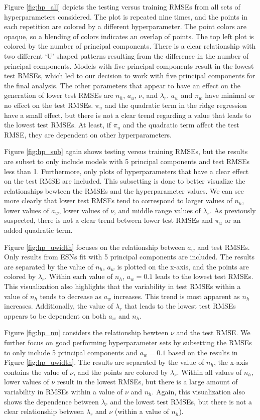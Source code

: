 \documentclass[AMS,STIX2COL]{WileyNJD-v2}
\begin{document}
Figure \ref{fig:hp_all} depicts the testing versus training RMSEs from all sets of hyperparameters considered.  The plot is repeated nine times, and the points in each repetition are colored by a different hyperparameter. The point colors are opaque, so a blending of colors indicates an overlap of points. The top left plot is colored by the number of principal components. There is a clear relationship with two different `U' shaped patterns resulting from the difference in the number of principal components. Models with five principal components result in the lowest test RMSEs, which led to our decision to work with five principal components for the final analysis. The other parameters that appear to have an effect on the generation of lower test RMSEs are $n_h$, $a_u$, $\nu$, and $\lambda_r$. $a_w$ and $\pi_w$ have minimal or no effect on the test RMSEs. $\pi_u$ and the quadratic term in the ridge regression have a small effect, but there is not a clear trend regarding a value that leads to the lowest test RMSEs. At least, if $\pi_u$ and the quadratic term affect the test RMSE, they are dependent on other hyperparameters.

Figure \ref{fig:hp_sub} again shows testing versus training RMSEs, but the results are subset to only include models with 5 principal components and test RMSEs less than 1. Furthermore, only plots of hyperparameters that have a clear effect on the test RMSE are included. This subsetting is done to better visualize the relationships bewteen the RMSEs and the hyperparameter values. We can see more clearly that lower test RMSEs tend to correspond to larger values of $n_h$, lower values of $a_w$, lower values of $\nu$, and middle range values of $\lambda_r$. As previously suspected, there is not a clear trend between lower test RMSEs and $\pi_u$ or an added quadratic term.

Figure \ref{fig:hp_uwidth} focuses on the relationship between $a_w$ and test RMSEs. Only results from ESNs fit with 5 principal components are included. The results are separated by the value of $n_h$, $a_w$ is plotted on the x-axis, and the points are colored by $\lambda_r$. Within each value of $n_h$, $a_w=0.1$ leads to the lowest test RMSEs. This visualization also highlights that the variability in test RMSEs within a value of $n_h$ tends to decrease as $a_w$ increases. This trend is most apparent as $n_h$ increases. Additionally, the value of $\lambda_r$ that leads to the lowest test RMSEs appears to be dependent on both $a_w$ and $n_h$.

Figure \ref{fig:hp_nu} considers the relationship bewteen $\nu$ and the test RMSE. We further focus on good performing hyperparameter sets by subsetting the RMSEs to only include 5 principal components and $a_w=0.1$ based on the results in Figure \ref{fig:hp_uwidth}. The results are separated by the value of $n_h$, the x-axis contains the value of $\nu$, and the points are colored by $\lambda_r$. Within all values of $n_h$, lower values of $\nu$ result in the lowest RMSEs, but there is a large amount of variability in RMSEs within a value of $\nu$ and $n_h$. Again, this visualization also shows the dependence between $\lambda_r$ and the lowest test RMSEs, but there is not a clear relationship between $\lambda_r$ and $\nu$ (within a value of $n_h$).
\end{document}
